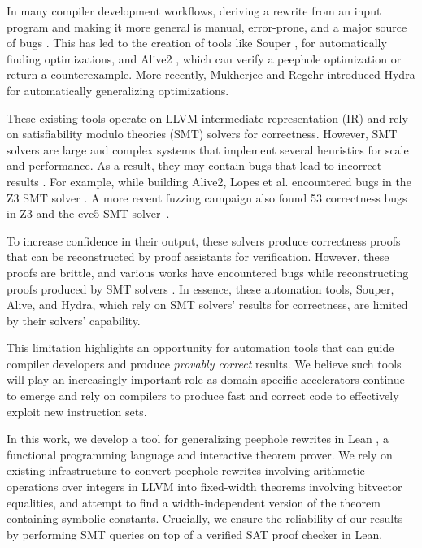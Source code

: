 \documentclass[review, anonymous, acmsmall]{acmart}
\begin{document}
In many compiler development workflows, deriving a rewrite from an input program and making it more general is manual, error-prone, and a major source of bugs \cite{yang_finding_2011}. This has led to the creation of tools like Souper \cite{sasnauskas_souper_2018}, for automatically finding optimizations, and Alive2 \cite{lopes_provably_2015, lopes_alive2_2021}, which can verify a peephole optimization or return a counterexample. More recently, Mukherjee and Regehr \cite{mukherjee_hydra_2024} introduced Hydra for automatically generalizing optimizations. 

These existing tools operate on LLVM intermediate representation (IR) and rely on satisfiability modulo theories (SMT) solvers for correctness. However, SMT solvers are large and complex systems that implement several heuristics for scale and performance. As a result, they may contain bugs that lead to incorrect results \cite{barbosa_challenges_2023}. For example, while building Alive2, Lopes et al. \cite{lopes_alive2_2021} encountered bugs in the Z3 SMT solver \cite{de_moura_z3_2008}. A more recent fuzzing campaign \cite{winterer_validating_2024} also found 53 correctness bugs in Z3 and the cvc5 SMT solver~\cite{barbosa_cvc5_2022}. 

To increase confidence in their output, these solvers produce correctness proofs that can be reconstructed by proof assistants for verification. However, these proofs are brittle, and various works have encountered bugs while reconstructing proofs produced by SMT solvers \cite{blanchette_extending_2011} \cite{bohme_fast_2010} \cite{bohme_reconstruction_2011}. In essence, these automation tools, Souper, Alive, and Hydra, which rely on SMT solvers' results for correctness, are limited by their solvers' capability.


This limitation highlights an opportunity for automation tools that can guide compiler developers and produce \textit{provably correct} results. We believe such tools will play an increasingly important role as domain-specific accelerators continue to emerge and rely on compilers to produce fast and correct code to effectively exploit new instruction sets. 

In this work, we develop a tool for generalizing peephole rewrites in Lean \cite{moura_lean_2021}, a functional programming language and interactive theorem prover. We rely on existing infrastructure \cite{bhat_verifying_2024} to convert peephole rewrites involving arithmetic operations over integers in LLVM into fixed-width theorems involving bitvector equalities, and attempt to find a width-independent version of the theorem containing symbolic constants. Crucially, we ensure the reliability of our results by performing SMT queries on top of a verified SAT proof checker in Lean.
\end{document}
